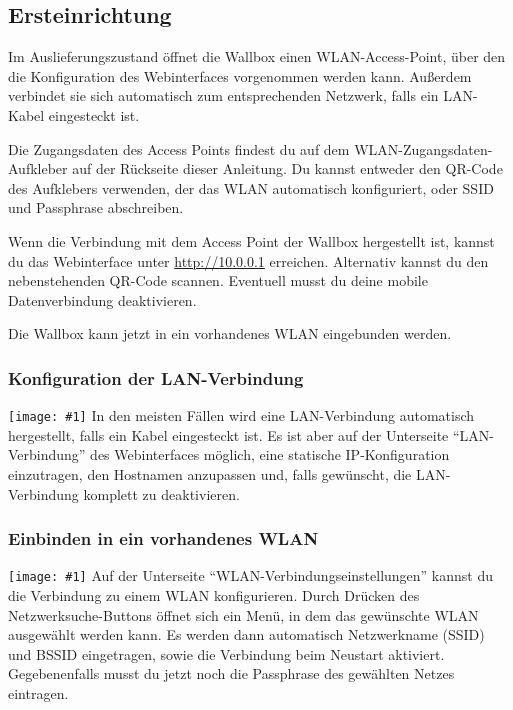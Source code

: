 \documentclass[a4paper,10pt]{article}
\newcommand{\gfx}[1]{\texttt{[image: \#1]}}
\begin{document}
\begin{multicols*}{2}
	\subsection{Ersteinrichtung}
	Im Auslieferungszustand öffnet die Wallbox einen WLAN-Access-Point, über den
	die Konfiguration des Webinterfaces vorgenommen werden kann. Außerdem verbindet sie sich automatisch
	zum entsprechenden Netzwerk, falls ein LAN-Kabel eingesteckt ist.

	Die Zugangsdaten des Access Points findest du auf dem WLAN-Zugangsdaten-Aufkleber
	auf der Rückseite dieser Anleitung. Du kannst entweder den QR-Code des Aufklebers verwenden,
	der das WLAN automatisch konfiguriert, oder SSID und Passphrase abschreiben.

	\begin{minipage}{0.35\textwidth}
		Wenn die Verbindung mit dem Access Point der Wallbox hergestellt ist, kannst du das Webinterface
		unter \url{http://10.0.0.1} erreichen. Alternativ kannst du den nebenstehenden QR-Code scannen.
		Eventuell musst du deine mobile Datenverbindung deaktivieren.
	\end{minipage}\hfill
	\begin{minipage}{0.12\textwidth}
		\begin{flushright}
		\end{flushright}
	\end{minipage}

	Die Wallbox kann jetzt in ein vorhandenes WLAN eingebunden werden.


	\subsubsection{Konfiguration der LAN-Verbindung}
	\gfx{./img_warp2/resized/web_ethernet}
	In den meisten Fällen wird eine LAN-Verbindung automatisch hergestellt, falls ein Kabel eingesteckt ist.
	Es ist aber auf der Unterseite \enquote{LAN-Verbindung} des Webinterfaces möglich, eine statische IP-Konfiguration
	einzutragen, den Hostnamen anzupassen und, falls gewünscht, die LAN-Verbindung komplett zu deaktivieren.

	\subsubsection{Einbinden in ein vorhandenes WLAN}
	\gfx{./img_warp2/resized/web_wifi_sta}
	Auf der Unterseite \enquote{WLAN-Verbindungseinstellungen} kannst du die Verbindung zu einem WLAN konfigurieren.
	Durch Drücken des Netzwerksuche-Buttons öffnet sich ein Menü, in dem das gewünschte WLAN ausgewählt werden kann.
	Es werden dann automatisch Netzwerkname (SSID) und BSSID eingetragen, sowie die Verbindung beim Neustart aktiviert.
	Gegebenenfalls musst du jetzt noch die Passphrase des gewählten Netzes eintragen.


\end{multicols*}
\end{document}
